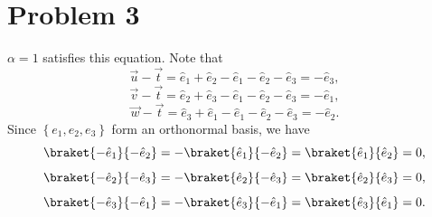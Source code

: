 \documentclass[11pt, letterpaper]{article}
\begin{document}
\section*{Problem 3}
$\alpha	=1$ satisfies this equation. Note that
\[
	\vec{u} - \vec{t}  =\hat{e} _1 + \hat{e} _2 - \hat{e} _1 - \hat{e}_2 - \hat{e}_3=-\hat{e} _3,
\]
\[
	\vec{v} - \vec{t} =\hat{e} _2 + \hat{e} _3 - \hat{e} _1 - \hat{e} _2 - \hat{e} _3 = - \hat{e} _1
,\]
\[
	\vec{w} - \vec{t} = \hat{e} _3 + \hat{e} _1 - \hat{e} _1 - \hat{e} _2 - \hat{e} _3 = -\hat{e} _2
.\]
Since $\left\{ e_1,e_2,e_3 \right\} $ form an orthonormal basis, we have
\[
	\braket{- \hat{e} _1}{-\hat{e} _2} =-\braket{\hat{e} _1}{-\hat{e} _2} =\braket{\hat{e} _1}{\hat{e} _2} =0
,\]
\[
	\braket{- \hat{e} _2}{- \hat{e} _3} =- \braket{\hat{e} _2}{- \hat{e} _3} =\braket{\hat{e} _2}{\hat{e} _3} =0
,\]
\[
	\braket{- \hat{e} _3}{- \hat{e} _1} =-\braket{\hat{e} _3}{- \hat{e} _1} =\braket{\hat{e} _3}{\hat{e} _1} =0
.\]
\end{document}
